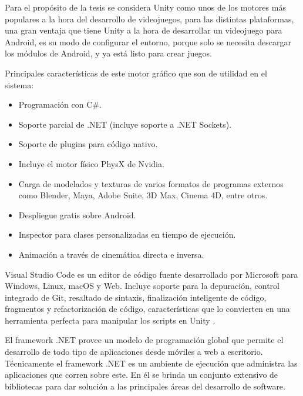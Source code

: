 \vspace{10pt}
Para el propósito de la tesis se considera Unity como unos de los motores más populares a la hora del desarrollo de videojuegos, para las distintas plataformas, una gran ventaja que tiene Unity a la hora de desarrollar un videojuego para Android, es su modo de configurar el entorno, porque solo se necesita descargar los módulos de Android, y ya está listo para crear juegos.

\vspace{5pt}
Principales características de este motor gráfico que son de utilidad en el sistema:~\cite{unity3d}

\begin{itemize}
    \item Programación con C\#.
    \item Soporte parcial de .NET (incluye soporte a .NET Sockets).
    \item Soporte de plugins para código nativo.
    \item Incluye el motor físico PhysX de Nvidia.
    \item Carga de modelados y texturas de varios formatos de programas externos como Blender, Maya, Adobe Suite, 3D Max, Cinema 4D, entre otros.
    \item Despliegue gratis sobre Android.
    \item Inspector para clases personalizadas en tiempo de ejecución.
    \item Animación a través de cinemática directa e inversa.
\end{itemize}

Visual Studio Code es un editor de código fuente desarrollado por Microsoft para Windows, Linux, macOS y Web. Incluye soporte para la depuración, control integrado de Git, resaltado de sintaxis, finalización inteligente de código, fragmentos y refactorización de código, características que lo convierten en una herramienta perfecta para manipular los scripts en Unity \cite{vscode}.

El framework .NET provee un modelo de programación global que permite el desarrollo de todo tipo de aplicaciones desde móviles a web a escritorio. Técnicamente el framework .NET es un ambiente de ejecución que administra las aplicaciones que corren sobre este. En él se brinda un conjunto extensivo de bibliotecas para dar solución a las principales áreas del desarrollo de software.

